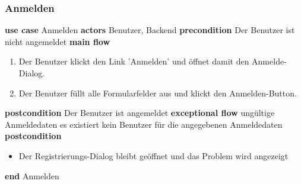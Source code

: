 \subsubsection{Anmelden}\label{subsubsec:uc_anm}
\noindent \textbf{use case} Anmelden \newline
\indent \textbf{actors} \newline
\indent \indent Benutzer, Backend \newline
\indent \textbf{precondition} \newline
\indent \indent Der Benutzer ist nicht angemeldet \newline
\indent \textbf{main flow}
\begin{enumerate}[labelwidth=0pt,leftmargin=39pt,noitemsep,topsep=0pt,parsep=0pt,partopsep=0pt]
\item Der Benutzer klickt den Link 'Anmelden' und öffnet damit den Anmelde-Dialog.
\item Der Benutzer füllt alle Formularfelder aus und klickt den Anmelden-Button.
\end{enumerate}
\indent \indent \textbf{postcondition} \newline
\indent \indent Der Benutzer ist angemeldet \newline
\indent \textbf{exceptional flow} ungültige Anmeldedaten \newline
\indent \indent es existiert kein Benutzer für die angegebenen Anmeldedaten \newline
\indent \textbf{postcondition}
\begin{itemize}[label={},labelwidth=0pt,leftmargin=24pt,noitemsep,topsep=0pt,parsep=0pt,partopsep=0pt]
\item Der Registrierungs-Dialog bleibt geöffnet und das Problem wird angezeigt
\end{itemize}
\noindent \textbf{end} Anmelden \newline

